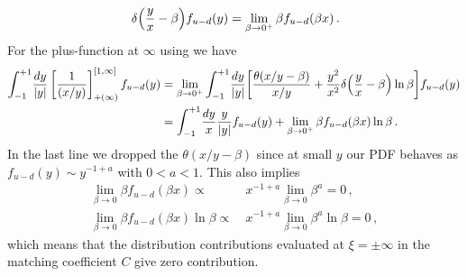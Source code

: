 \begin{widetext}
\begin{align}
\, \delta\Big({y\over x} -\beta\Big) f_{u-d}(y)
=\lim_{\beta\to0^+}\beta f_{u-d}(\beta x)\,.
\end{align}
For the plus-function at $\infty$ using  we have
\begin{align}
\int_{-1}^{+1}\! {dy\over |y|} \left[{1\over (x/y)}\right]_{+(\infty)}^{[1,\infty]} f_{u-d}(y)
&= \lim_{\beta\to 0^+} \int_{-1}^{+1}\! {dy\over |y|}
\bigg[  {\theta(x/y-\beta) \over x/y}
+ {y^2\over x^2}\delta\Bigl({y\over x} -\beta\Bigr)\ln\beta  \bigg] f_{u-d}(y)
\\
&= \int_{-1}^{+1}\! {dy\over x} {y\over |y|} f_{u-d}(y)
+ \lim_{\beta\to 0^+}\beta f_{u-d}(\beta x)\ln\beta
\,. \nonumber
\end{align}
In the last line we dropped the $\theta(x/y-\beta)$ since at small $y$ our PDF behaves as $f_{u-d}(y)\sim y^{-1+a}$ with $0<a<1$. This also implies
\begin{align}
\lim_{\beta\to0}\beta f_{u-d}(\beta x) \propto\: & x^{-1+a}\lim_{\beta\to0} \beta^a  =0\,, \\
\lim_{\beta\to0}\beta f_{u-d}(\beta x)\ln\beta \propto\: & x^{-1+a}\lim_{\beta\to0} \beta^a \ln\beta =0\,,
\end{align}
which means that the distribution contributions evaluated at $\xi=\pm\infty$ in the matching coefficient $C$ give zero contribution.


\end{widetext}
